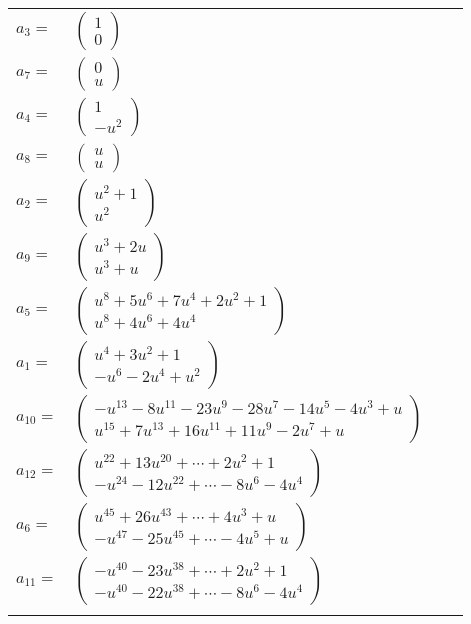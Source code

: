 \documentclass[1p]{elsarticle_modified}
\theoremstyle{definition}
\begin{document}
\begin{tabular}{m{7pt} m{180pt} m{7pt} m{180pt} }
\flushright $a_{3}=$&$\begin{pmatrix}1\\0\end{pmatrix}$ \\
\flushright $a_{7}=$&$\begin{pmatrix}0\\u\end{pmatrix}$ \\
\flushright $a_{4}=$&$\begin{pmatrix}1\\- u^2\end{pmatrix}$ \\
\flushright $a_{8}=$&$\begin{pmatrix}u\\u\end{pmatrix}$ \\
\flushright $a_{2}=$&$\begin{pmatrix}u^2+1\\u^2\end{pmatrix}$ \\
\flushright $a_{9}=$&$\begin{pmatrix}u^3+2 u\\u^3+u\end{pmatrix}$ \\
\flushright $a_{5}=$&$\begin{pmatrix}u^8+5 u^6+7 u^4+2 u^2+1\\u^8+4 u^6+4 u^4\end{pmatrix}$ \\
\flushright $a_{1}=$&$\begin{pmatrix}u^4+3 u^2+1\\- u^6-2 u^4+u^2\end{pmatrix}$ \\
\flushright $a_{10}=$&$\begin{pmatrix}- u^{13}-8 u^{11}-23 u^9-28 u^7-14 u^5-4 u^3+u\\u^{15}+7 u^{13}+16 u^{11}+11 u^9-2 u^7+u\end{pmatrix}$ \\
\flushright $a_{12}=$&$\begin{pmatrix}u^{22}+13 u^{20}+\cdots+2 u^2+1\\- u^{24}-12 u^{22}+\cdots-8 u^6-4 u^4\end{pmatrix}$ \\
\flushright $a_{6}=$&$\begin{pmatrix}u^{45}+26 u^{43}+\cdots+4 u^3+u\\- u^{47}-25 u^{45}+\cdots-4 u^5+u\end{pmatrix}$ \\
\flushright $a_{11}=$&$\begin{pmatrix}- u^{40}-23 u^{38}+\cdots+2 u^2+1\\- u^{40}-22 u^{38}+\cdots-8 u^6-4 u^4\end{pmatrix}$\\&\end{tabular}
\end{document}
